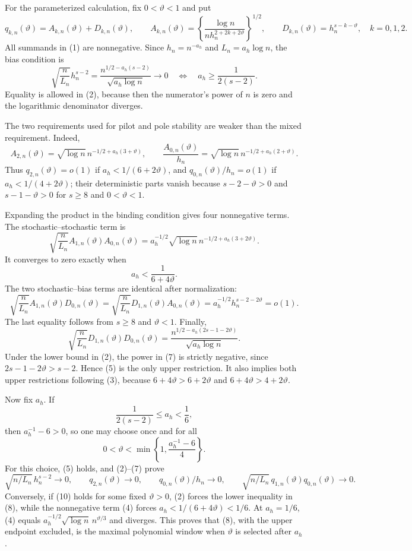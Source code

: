 For the parameterized calculation, fix \(0<\vartheta<1\) and put
\[
 q_{k,n}(\vartheta)
 =A_{k,n}(\vartheta)+D_{k,n}(\vartheta),\qquad
 A_{k,n}(\vartheta)
 =\left\{\frac{\log n}{n h_n^{2+2k+2\vartheta}}\right\}^{1/2},
 \qquad
 D_{k,n}(\vartheta)=h_n^{s-k-\vartheta},
 \quad k=0,1,2.
\tag{1}
\]
All summands in (1) are nonnegative.  Since \(h_n=n^{-a_h}\) and
\(L_n=a_h\log n\), the bias condition is
\[
 \sqrt{\frac n{L_n}}h_n^{s-2}
 =\frac{n^{1/2-a_h(s-2)}}{\sqrt{a_h\log n}}\longrightarrow0
 \quad\Longleftrightarrow\quad
 a_h\geq\frac1{2(s-2)}.
\tag{2}
\]
Equality is allowed in (2), because then the numerator's power of \(n\) is zero and the logarithmic denominator diverges.

The two requirements used for pilot and pole stability are weaker than the mixed requirement.  Indeed,
\[
 A_{2,n}(\vartheta)
 =\sqrt{\log n}\,n^{-1/2+a_h(3+\vartheta)},
 \qquad
 \frac{A_{0,n}(\vartheta)}{h_n}
 =\sqrt{\log n}\,n^{-1/2+a_h(2+\vartheta)}.
\tag{3}
\]
Thus \(q_{2,n}(\vartheta)=o(1)\) if
\(a_h<1/(6+2\vartheta)\), and
\(q_{0,n}(\vartheta)/h_n=o(1)\) if
\(a_h<1/(4+2\vartheta)\); their deterministic parts vanish because
\(s-2-\vartheta>0\) and \(s-1-\vartheta>0\) for \(s\geq8\) and
\(0<\vartheta<1\).

Expanding the product in the binding condition gives four nonnegative terms.  The stochastic--stochastic term is
\[
 \sqrt{\frac n{L_n}}A_{1,n}(\vartheta)A_{0,n}(\vartheta)
 =a_h^{-1/2}\sqrt{\log n}\,
   n^{-1/2+a_h(3+2\vartheta)}.
\tag{4}
\]
It converges to zero exactly when
\[
 a_h<\frac1{6+4\vartheta}.
\tag{5}
\]
The two stochastic--bias terms are identical after normalization:
\[
 \sqrt{\frac n{L_n}}A_{1,n}(\vartheta)D_{0,n}(\vartheta)
 =\sqrt{\frac n{L_n}}D_{1,n}(\vartheta)A_{0,n}(\vartheta)
 =a_h^{-1/2}h_n^{s-2-2\vartheta}=o(1).
\tag{6}
\]
The last equality follows from \(s\geq8\) and \(\vartheta<1\).  Finally,
\[
 \sqrt{\frac n{L_n}}D_{1,n}(\vartheta)D_{0,n}(\vartheta)
 =\frac{n^{1/2-a_h(2s-1-2\vartheta)}}{\sqrt{a_h\log n}}.
\tag{7}
\]
Under the lower bound in (2), the power in (7) is strictly negative, since
\(2s-1-2\vartheta>s-2\).  Hence (5) is the only upper restriction.  It also implies both upper restrictions following (3), because
\(6+4\vartheta>6+2\vartheta\) and
\(6+4\vartheta>4+2\vartheta\).

Now fix \(a_h\).  If
\[
 \frac1{2(s-2)}\leq a_h<\frac16,
\tag{8}
\]
then \(a_h^{-1}-6>0\), so one may choose once and for all
\[
 0<\vartheta<\min\left\{1,\frac{a_h^{-1}-6}{4}\right\}.
\tag{9}
\]
For this choice, (5) holds, and (2)--(7) prove
\[
 \sqrt{n/L_n}\,h_n^{s-2}\to0,
 \qquad q_{2,n}(\vartheta)\to0,
 \qquad q_{0,n}(\vartheta)/h_n\to0,
 \qquad
 \sqrt{n/L_n}\,q_{1,n}(\vartheta)q_{0,n}(\vartheta)\to0.
\tag{10}
\]
Conversely, if (10) holds for some fixed \(\vartheta>0\), (2) forces the lower inequality in (8), while the nonnegative term (4) forces
\(a_h<1/(6+4\vartheta)<1/6\).  At \(a_h=1/6\), (4) equals
\(a_h^{-1/2}\sqrt{\log n}\,n^{\vartheta/3}\) and diverges.  This proves that (8), with the upper endpoint excluded, is the maximal polynomial window when \(\vartheta\) is selected after \(a_h\).

